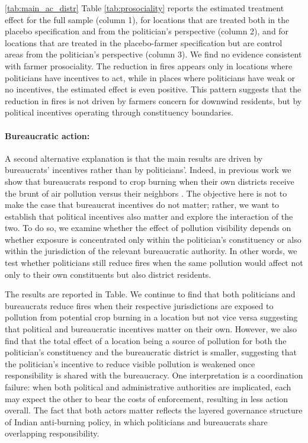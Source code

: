 \documentclass[12pt]{article}
\begin{document}
 \ref{tab:main_ac_distr}  Table \ref{tab:prosociality} reports the estimated treatment effect for the full sample (column 1), for locations that are treated both in the placebo specification and from the politician’s perspective (column 2), and for locations that are treated in the placebo-farmer specification but are control areas from the politician’s perspective (column 3). We find no evidence consistent with farmer prosociality. The reduction in fires appears only in locations where politicians have incentives to act, while in places where politicians have weak or no incentives, the estimated effect is even positive. This pattern suggests that the reduction in fires is not driven by farmers concern for downwind residents, but by political incentives operating through constituency boundaries.

\paragraph{Bureaucratic action:}
A second alternative explanation is that the main results are driven by bureaucrats' incentives rather than by politicians'. Indeed, in previous work we show that bureaucrats respond to crop burning when their own districts receive the brunt of air pollution versus their neighbors \citep{dipoppa2024bureaucrat}. The objective here is not to make the case that bureaucrat incentives do not matter; rather, we want to establish that political incentives also matter and explore the interaction of the two. To do so, we examine whether the effect of pollution visibility depends on whether exposure is concentrated only within the politician’s constituency or also within the jurisdiction of the relevant bureaucratic authority. In other words, we test whether politicians still reduce fires when the same pollution would affect not only to their own constituents but also district residents.

The results are reported in Table. We continue to find that both politicians and bureaucrats reduce fires when their respective jurisdictions are exposed to pollution from potential crop burning in a location but not vice versa suggesting that political and bureaucratic incentives matter on their own. However, we also find that the total effect of a location being a source of pollution for both the politician's constituency and the bureaucratic district is smaller, suggesting that the politician’s incentive to reduce visible pollution is weakened once responsibility is shared with the bureaucracy. One interpretation is a coordination failure: when both political and administrative authorities are implicated, each may expect the other to bear the costs of enforcement, resulting in less action overall. The fact that both actors matter reflects the layered governance structure of Indian anti-burning policy, in which politicians and bureaucrats share overlapping responsibility.
\end{document}

